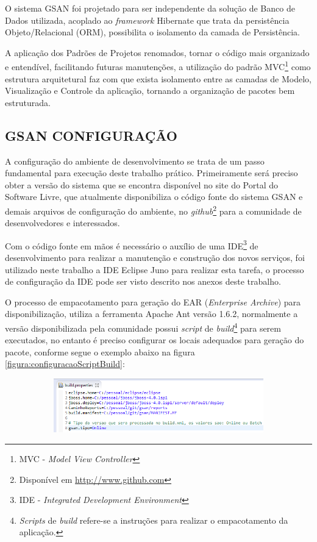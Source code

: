 O sistema GSAN foi projetado para ser independente da solução de Banco de Dados utilizada, acoplado ao \textit{framework} Hibernate que trata da persistência Objeto/Relacional (ORM), possibilita o isolamento da camada de Persistência.

A aplicação dos Padrões de Projetos renomados, tornar o código mais organizado e entendível, facilitando futuras manutenções, a utilização do padrão MVC\footnote{MVC - \textit{Model View Controller}} como estrutura arquitetural faz com que exista isolamento entre as camadas de Modelo, Visualização e Controle da aplicação, tornando a organização de pacotes bem estruturada.
	
	
\subsection{\textbf{GSAN CONFIGURAÇÃO}}
A configuração do ambiente de desenvolvimento se trata de um passo fundamental para execução deste trabalho prático. Primeiramente será preciso obter a versão do sistema que se encontra disponível no site do Portal do Software Livre, que atualmente disponibiliza o código fonte do sistema GSAN e demais arquivos de configuração do ambiente, no \textit{github}\footnote{Disponível em \url{http://www.github.com}} para a comunidade de desenvolvedores e interessados. 

Com o código fonte em mãos é necessário o auxílio de uma IDE\footnote{IDE - \textit{Integrated Development Environment}} de desenvolvimento para realizar a manutenção e construção dos novos serviços, foi utilizado neste trabalho a IDE Eclipse Juno para realizar esta tarefa, o processo de configuração da IDE pode ser visto descrito nos anexos deste trabalho.

O processo de empacotamento para geração do EAR (\textit{Enterprise Archive}) para disponibilização, utiliza a ferramenta Apache Ant versão 1.6.2, normalmente a versão disponibilizada pela comunidade possui \textit{script} de \textit{build}\footnote{\textit{Scripts} de \textit{build} refere-se a instruções para realizar o empacotamento da aplicação.} para serem executados, no entanto é preciso configurar os locais adequados para geração do pacote, conforme segue o exemplo abaixo na figura \ref{figura:configuracaoScriptBuild}:

\begin{figure}[H]
	\centering
	\caption{Exemplo de configuração do \textit{script} build}
	\label{figura:configuracaoScriptBuild}	
	\begin{subfigure}[H]{\textwidth}
		\centering
		\includegraphics{figuras/build_properties.png}
	\end{subfigure}
\end{figure}
	
